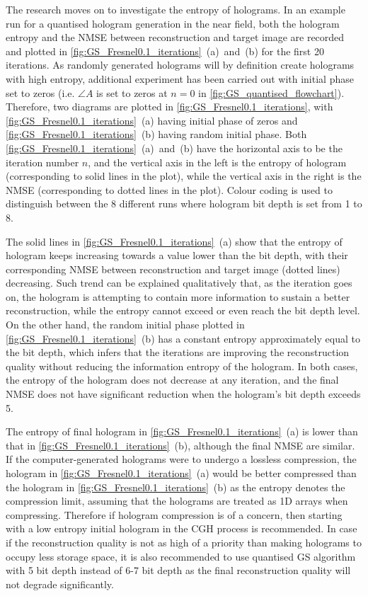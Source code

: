 	The research moves on to investigate the entropy of holograms. In an example run for a quantised hologram generation in the near field, both the hologram entropy and the NMSE between reconstruction and target image are recorded and plotted in \cref{fig:GS_Fresnel0.1_iterations}~(a)~and~(b) for the first 20 iterations. As randomly generated holograms will by definition create holograms with high entropy, additional experiment has been carried out with initial phase set to zeros (i.e. $\angle A$ is set to zeros at $n=0$ in \cref{fig:GS_quantised_flowchart}). Therefore, two diagrams are plotted in \cref{fig:GS_Fresnel0.1_iterations}, with \cref{fig:GS_Fresnel0.1_iterations}~(a) having initial phase of zeros and \cref{fig:GS_Fresnel0.1_iterations}~(b) having random initial phase. Both \cref{fig:GS_Fresnel0.1_iterations}~(a)~and~(b) have the horizontal axis to be the iteration number $n$, and the vertical axis in the left is the entropy of hologram (corresponding to solid lines in the plot), while the vertical axis in the right is the NMSE (corresponding to dotted lines in the plot). Colour coding is used to distinguish between the 8 different runs where hologram bit depth is set from 1 to 8.

	The solid lines in \cref{fig:GS_Fresnel0.1_iterations}~(a) show that the entropy of hologram keeps increasing towards a value lower than the bit depth, with their corresponding NMSE between reconstruction and target image (dotted lines) decreasing. Such trend can be explained qualitatively that, as the iteration goes on, the hologram is attempting to contain more information to sustain a better reconstruction, while the entropy cannot exceed or even reach the bit depth level. On the other hand, the random initial phase plotted in \cref{fig:GS_Fresnel0.1_iterations}~(b) has a constant entropy approximately equal to the bit depth, which infers that the iterations are improving the reconstruction quality without reducing the information entropy of the hologram. In both cases, the entropy of the hologram does not decrease at any iteration, and the final NMSE does not have significant reduction when the hologram's bit depth exceeds 5.

	The entropy of final hologram in \cref{fig:GS_Fresnel0.1_iterations}~(a) is lower than that in \cref{fig:GS_Fresnel0.1_iterations}~(b), although the final NMSE are similar. If the computer-generated holograms were to undergo a lossless compression, the hologram in \cref{fig:GS_Fresnel0.1_iterations}~(a) would be better compressed than the hologram in \cref{fig:GS_Fresnel0.1_iterations}~(b) as the entropy denotes the compression limit, assuming that the holograms are treated as 1D arrays when compressing. Therefore if hologram compression is of a concern, then starting with a low entropy initial hologram in the CGH process is recommended. In case if the reconstruction quality is not as high of a priority than making holograms to occupy less storage space, it is also recommended to use quantised GS algorithm with 5 bit depth instead of 6-7 bit depth as the final reconstruction quality will not degrade significantly.



